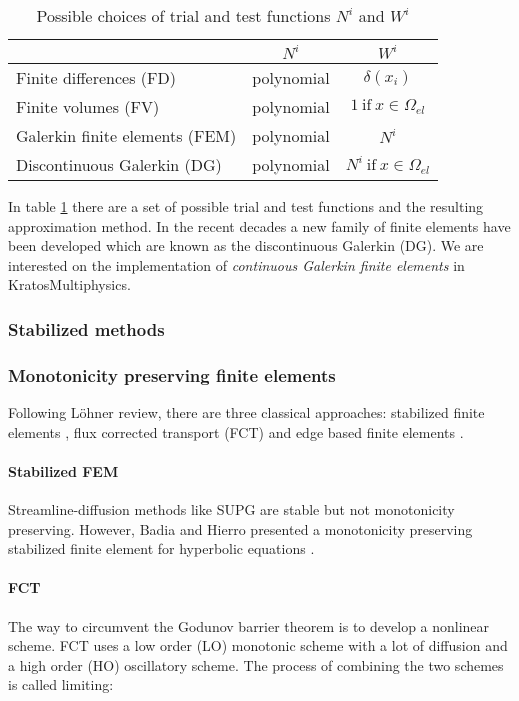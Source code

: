 \begin{table}
\centering
\begin{tabular}{|l|c|c|}
\hline
 & $N^i$ & $W^i$ \\ \hline
Finite differences (FD)         & polynomial & $\delta(x_i)$ \\ \hline
Finite volumes (FV)             & polynomial & $1 \ \text{if} \ x\in\Omega_{el}$ \\ \hline
Galerkin finite elements (FEM)  & polynomial & $N^i$ \\ \hline
Discontinuous Galerkin (DG)     & polynomial & $N^i \ \text{if} \ x\in\Omega_{el}$ \\ \hline
\end{tabular}
\caption{Possible choices of trial and test functions $N^i$ and $W^i$}
\label{possible_trial_functions}
\end{table}

In table \ref{possible_trial_functions} there are a set of possible trial and test functions and the resulting approximation method. In the recent decades a new family of finite elements have been developed which are known as the discontinuous Galerkin (DG). We are interested on the implementation of \emph{continuous Galerkin finite elements} in KratosMultiphysics.


\subsubsection{Stabilized methods}



\subsubsection{Monotonicity preserving finite elements}

Following Löhner review, there are three classical approaches: stabilized finite elements \cite{lohner2008}, flux corrected transport (FCT) \cite{lohner2008ch9} and edge based finite elements \cite{lohner2008ch10}.

\paragraph*{Stabilized FEM} Streamline-diffusion methods like SUPG are stable but not
monotonicity preserving. However, Badia and Hierro presented a monotonicity preserving stabilized finite element for hyperbolic equations \cite{badia2014}.

\paragraph*{FCT} The way to circumvent the Godunov barrier theorem \cite{godunov1959} is to develop a nonlinear scheme. FCT uses a low order (LO) monotonic scheme with a lot of diffusion and a high order (HO) oscillatory scheme. The process of combining the two schemes is called limiting:

